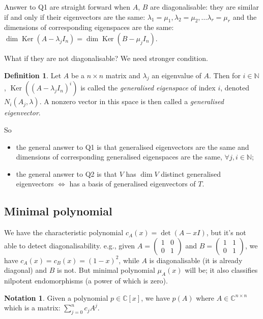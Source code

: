 \documentclass[a4paper]{article}
\newcommand{\Ker}{\operatorname{Ker}}
\theoremstyle{definition}
\newtheorem{defn}{Definition}[subsection]
\newtheorem*{notation}{Notation}
\begin{document}
Answer to Q1 are straight forward when $A$, $B$ are diagonalisable: they are similar if and only if their eigenvectors are the same: $\lambda_1=\mu_1, \lambda_2=\mu_2,\ldots \lambda_r=\mu_r$ and the dimensions of corresponding eigenspaces are the same: $\dim \Ker (A-\lambda_j I_n) = \dim \Ker (B-\mu_j I_n)$.

What if they are not diagonalisable? We need stronger condition.

\begin{defn}
	Let $A$ be a $n\times n$ matrix and $\lambda_j$ an eigenvalue of $A$. Then for $i \in \mathbb N$, $\Ker \left( (A-\lambda_j I_n)^i \right)$ is called the \textit{generalised eigenspace} of index $i$, denoted $N_i (A_j, \lambda)$. A nonzero vector in this space is then called a \textit{generalised eigenvector}.
\end{defn}

So \begin{itemize}
	\item the general answer to Q1 is that generalised eigenvectors are the same and dimensions of corresponding generalised eigenspaces are the same, $\forall j,i \in \mathbb N$;
	\item the general answer to Q2 is that $V$ has $\dim V$ distinct generalised eigenvectors $\Leftrightarrow$ has a basis of generalised eigenvectors of $T$.
\end{itemize}

\subsection{Minimal polynomial}
We have the characteristic polynomial $c_{A}(x)=\det (A-xI)$, but it's not able to detect diagonalisability. e.g., given $A = \begin{pmatrix}
	1 & 0 \\ 0 & 1
\end{pmatrix}$ and $B = \begin{pmatrix}
	1 & 1 \\ 0 & 1
\end{pmatrix}$, we have $c_{A}(x)=c_{B}(x)=(1-x)^2$, while $A$ is diagonalisable (it is already diagonal) and $B$ is not. But minimal polynomial $\mu_{A}(x)$ will be; it also classifies nilpotent endomorphisms (a power of which is zero).

\begin{notation}
	Given a polynomial $p \in \mathbb C [x]$, we have $p(A)$ where $A \in \mathbb C^{n \times n}$ which is a matrix: $\displaystyle \sum_{j=0}^n c_j A^j$.
\end{notation}
\end{document}
